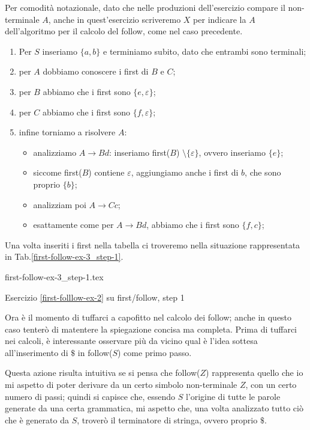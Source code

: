 \documentclass[class=book, crop=false, oneside, 12pt]{standalone}
\begin{document}
Per comodità notazionale, dato che nelle produzioni dell'esercizio compare il non-terminale \(A\), anche in quest'esercizio scriveremo \(X\) per indicare la \(A\) dell'algoritmo per il calcolo del follow, come nel caso precedente.
\begin{enumerate}
    \item Per \(S\) inseriamo \(\{a, b\}\) e terminiamo subito, dato che entrambi sono terminali;
    \item per \(A\) dobbiamo conoscere i first di \(B\) e \(C\);
    \item per \(B\) abbiamo che i first sono \(\{e, \varepsilon\}\);
    \item per \(C\) abbiamo che i first sono \(\{f, \varepsilon\}\);
    \item infine torniamo a risolvere \(A\):
    \begin{itemize}
        \item analizziamo \(A \to Bd\): inseriamo first(\(B\)) \(\setminus \{\varepsilon\}\), ovvero inseriamo \(\{e\}\);
        \item siccome first(\(B\)) contiene \(\varepsilon\), aggiungiamo anche i first di \(b\), che sono proprio \(\{b\}\);
        \item analizziam poi \(A \to Cc\);
        \item esattamente come per \(A \to Bd\), abbiamo che i first sono \(\{f, c\}\);
    \end{itemize}
\end{enumerate}
Una volta inseriti i first nella tabella ci troveremo nella situazione rappresentata in Tab.\ref{first-follow-ex-3_step-1}.
\begin{table}[H]
	\centering
	{first-follow-ex-3_step-1.tex}
    \caption{Esercizio \ref{first-folllow-ex-2} su first/follow, step 1}
    \label{first-follow-ex-3_step-1}
\end{table}
Ora è il momento di tuffarci a capofitto nel calcolo dei follow; anche in questo caso tenterò di matentere la spiegazione concisa ma completa. Prima di tuffarci nei calcoli, è interessante osservare più da vicino qual è l’idea sottesa all'inserimento di \(\$\) in follow(\(S\)) come primo passo.

Questa azione risulta intuitiva se si pensa che follow(\(Z\)) rappresenta quello che io mi aspetto di poter derivare da un certo simbolo non-terminale \(Z\), con un certo numero di passi; quindi si capisce che, essendo \(S\) l’origine di tutte le parole generate da una certa grammatica, mi aspetto che, una volta analizzato tutto ciò che è generato da \(S\), troverò il terminatore di stringa, ovvero proprio \(\$\).
\end{document}
